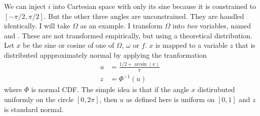 We can inject $i$ into Cartesian space with only its sine because it is constrained to $[-\pi/2, \pi/2]$.
But the other three angles are unconstrained.  
They are handled identically.
I will take $\Omega$ as an example.
I transform $\Omega$ into \textit{two} variables, named  and .
These are not transformed empirically, but using a theoretical distribution.
Let $x$ be the sine or cosine of one of $\Omega$, $\omega$ or $f$.
$x$ is mapped to a variable $z$ that is distributed appproximately normal by applying the tranformation
\begin{align*}
u &= \frac{1/2 + \arcsin(x)}{\pi} \\
z &= \Phi^{-1}(u)
\end{align*}
where $\Phi$ is normal CDF.
The simple idea is that if the angle $x$ distirubuted uniformly on the circle $[0, 2 \pi]$, 
then $u$ as defined here is uniform on $[0,1]$ and $z$ is standard normal.


